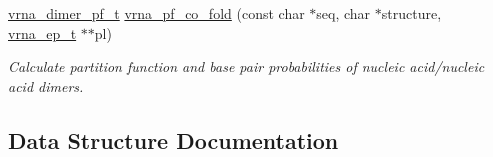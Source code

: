 \begin{DoxyCompactItemize}
\hyperlink{group__pf__cofold_ga444df1587c9a2ca15b8eb25188f629c3}{vrna\+\_\+dimer\+\_\+pf\+\_\+t} \hyperlink{group__part__func__global_gaf2b846f7ac382686f35ff7b9202fdd5c}{vrna\+\_\+pf\+\_\+co\+\_\+fold} (const char $\ast$seq, char $\ast$structure, \hyperlink{group__struct__utils__plist_gab9ac98ab55ded9fb90043b024b915aca}{vrna\+\_\+ep\+\_\+t} $\ast$$\ast$pl)
\begin{DoxyCompactList}\small\item\em Calculate partition function and base pair probabilities of nucleic acid/nucleic acid dimers. \end{DoxyCompactList}\end{DoxyCompactItemize}


\subsection{Data Structure Documentation}
\label{structvrna__dimer__pf__s}
